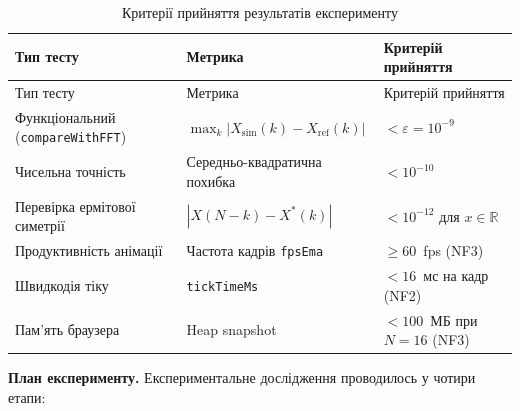 \begin{longtable}[]{@{}
  >{\raggedright\arraybackslash}p{}
  >{\raggedright\arraybackslash}p{}
  >{\raggedright\arraybackslash}p{}@{}}
\caption{\protect{}\label{tab:acceptance_criteria}{}Критерії
прийняття результатів експерименту}\tabularnewline
\toprule\noalign{}
\begin{minipage}[b]{\linewidth}\raggedright
Тип тесту
\end{minipage} & \begin{minipage}[b]{\linewidth}\raggedright
Метрика
\end{minipage} & \begin{minipage}[b]{\linewidth}\raggedright
Критерій прийняття
\end{minipage} \\
\midrule\noalign{}
\endfirsthead
\toprule\noalign{}
\begin{minipage}[b]{\linewidth}\raggedright
Тип тесту
\end{minipage} & \begin{minipage}[b]{\linewidth}\raggedright
Метрика
\end{minipage} & \begin{minipage}[b]{\linewidth}\raggedright
Критерій прийняття
\end{minipage} \\
\midrule\noalign{}
\endhead
\bottomrule\noalign{}
\endlastfoot
Функціональний (\texttt{compareWithFFT}) &
\(\max_{k}|X_{\text{sim}}(k) - X_{\text{ref}}(k)|\) &
\(< \varepsilon = 10^{- 9}\) \\
Чисельна точність & Середньо-квадратична похибка & \(< 10^{- 10}\) \\
Перевірка ермітової симетрії & \(|X(N - k) - X^{*}(k)|\) &
\(< 10^{- 12}\) для \(x\mathbb{\in R}\) \\
Продуктивність анімації & Частота кадрів \texttt{fpsEma} &
\(\geq 60\)~fps (NF3) \\
Швидкодія тіку & \texttt{tickTimeMs} & \(< 16\)~мс на кадр (NF2) \\
Пам'ять браузера & Heap snapshot & \(< 100\)~МБ при \(N = 16\) (NF3) \\
\end{longtable}

\textbf{План експерименту.} Експериментальне дослідження проводилось у
чотири етапи:

